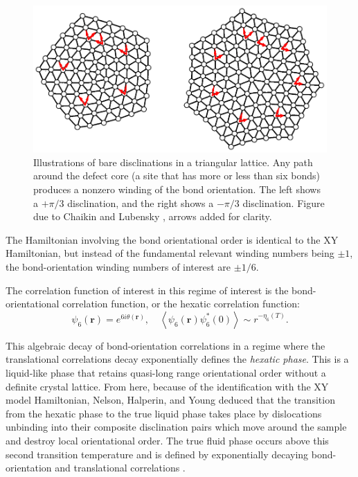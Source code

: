 \documentclass[a4paper,10pt]{article}
\newcommand{\beq}{\begin{equation}}
\newcommand{\eeq}{\end{equation}}
\renewcommand{\th}{\theta}
\newcommand{\avg}[1]{\left \langle #1 \right \rangle}
\newcommand{\bv}[1]{\mathbf{#1}}
\newcommand{\br}{\ensuremath{\bv{r}}}
\begin{document}
\begin{figure}
 \centering
 \includegraphics[scale=1.2]{disclinations.eps}
 \caption{Illustrations of bare disclinations in a triangular lattice. Any 
path around the defect core (a site that has more or less than six bonds) 
produces a nonzero winding of the bond orientation. The left shows a 
$+\pi/3$ disclination, and the right shows a $-\pi/3$ disclination. Figure due 
to Chaikin and Lubensky \cite{Chaikin}, arrows added for clarity.}
\label{disclinations}
\end{figure}

The Hamiltonian involving the bond orientational order is identical to the XY 
Hamiltonian, but instead of the fundamental relevant winding numbers being 
$\pm1$, the bond-orientation winding numbers of interest are $\pm1/6$.

The correlation function of interest in this regime of interest is the 
bond-orientational correlation function, or the hexatic correlation function:
\beq \psi_6(\br) = e^{6i\th(\br)},\quad \avg{\psi_6(\br)\psi_6^*(0)} \sim 
r^{-\eta_6(T)}. \eeq

This algebraic decay of bond-orientation correlations in a regime where the 
translational correlations decay exponentially defines the \emph{hexatic 
phase}. This is a liquid-like phase that retains quasi-long range 
orientational order without a definite crystal lattice. From here, because of 
the identification with the XY model Hamiltonian, Nelson, Halperin, and Young 
deduced that the transition from the hexatic phase to the true liquid phase 
takes place by dislocations unbinding into their composite disclination pairs 
which move around the sample and destroy local orientational order. The true 
fluid phase occurs above this second transition temperature and is defined by 
exponentially decaying bond-orientation and translational correlations 
\cite{2dmelt,young}.
\end{document}
